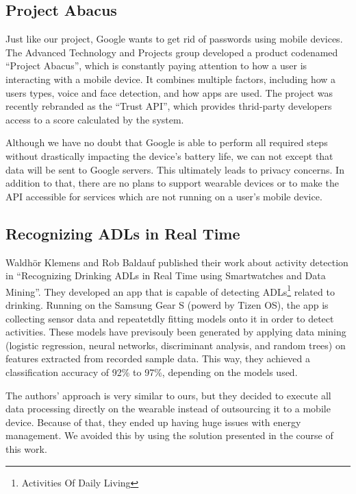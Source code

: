 \clearpage

\subsection{Project Abacus}
Just like our project, Google wants to get rid of passwords using mobile devices.
The Advanced Technology and Projects group developed a product codenamed ``Project Abacus'', which is constantly paying attention to how a user is interacting with a mobile device.
It combines multiple factors, including how a users types, voice and face detection, and how apps are used.
The project was recently rebranded as the ``Trust API'', which provides thrid-party developers access to a score calculated by the system.

Although we have no doubt that Google is able to perform all required steps without drastically impacting the device's battery life, we can not except that data will be sent to Google servers.
This ultimately leads to privacy concerns.
In addition to that, there are no plans to support wearable devices or to make the API accessible for services which are not running on a user's mobile device.

\subsection{Recognizing ADLs in Real Time}
Waldhör Klemens and Rob Baldauf published their work about activity detection in ``Recognizing Drinking ADLs in Real Time using Smartwatches and Data Mining''\cite{paper:drinkingadls}.
They developed an app that is capable of detecting ADLs\footnote{Activities Of Daily Living} related to drinking.
Running on the Samsung Gear S (powerd by Tizen OS), the app is collecting sensor data and repeatetdly fitting models onto it in order to detect activities.
These models have previsouly been generated by applying data mining (logistic regression, neural networks, discriminant analysis, and random trees) on features extracted from recorded sample data. This way, they achieved a classification accuracy of 92\% to 97\%, depending on the models used.

The authors' approach is very similar to ours, but they decided to execute all data processing directly on the wearable instead of outsourcing it to a mobile device.
Because of that, they ended up having huge issues with energy management. We avoided this by using the solution presented in the course of this work.

\clearpage